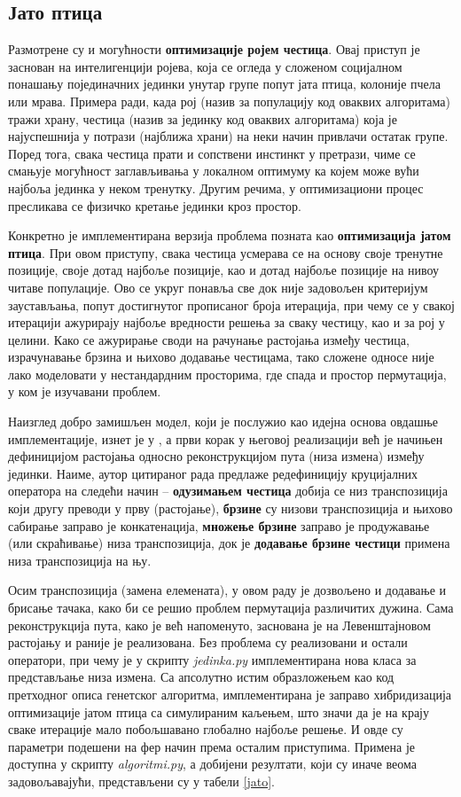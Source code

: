 \documentclass[a4paper]{article}
\begin{document}
\subsection{Јато птица}

Размотрене су и могућности \textbf{оптимизације ројем честица}. Овај приступ је заснован на интелигенцији ројева, која се огледа у сложеном социјалном понашању појединачних јединки унутар групе попут јата птица, колоније пчела или мрава. Примера ради, када рој (назив за популацију код оваквих алгоритама) тражи храну, честица (назив за јединку код оваквих алгоритама) која је најуспешнија у потрази (најближа храни) на неки начин привлачи остатак групе. Поред тога, свака честица прати и сопствени инстинкт у претрази, чиме се смањује могућност заглављивања у локалном оптимуму ка којем може вући најбоља јединка у неком тренутку. Другим речима, у оптимизациони процес пресликава се физичко кретање јединки кроз простор.

Конкретно је имплементирана верзија проблема позната као \textbf{оптимизација јатом птица}. При овом приступу, свака честица усмерава се на основу своје тренутне позиције, своје дотад најбоље позиције, као и дотад најбоље позиције на нивоу читаве популације. Ово се укруг понавља све док није задовољен критеријум заустављања, попут достигнутог прописаног броја итерација, при чему се у свакој итерацији ажурирају најбоље вредности решења за сваку честицу, као и за рој у целини. Како се ажурирање своди на рачунање растојања између честица, израчунавање брзина и њихово додавање честицама, тако сложене односе није лако моделовати у нестандардним просторима, где спада и простор пермутација, у ком је изучавани проблем.

Наизглед добро замишљен модел, који је послужио као идејна основа овдашње имплементације, изнет је у \cite{clerc}, а први корак у његовој реализацији већ је начињен дефиницијом растојања односно реконструкцијом пута (низа измена) између јединки. Наиме, аутор цитираног рада предлаже редефиницију круцијалних оператора на следећи начин -- \textbf{одузимањем честица} добија се низ транспозиција који другу преводи у прву (растојање), \textbf{брзине} су низови транспозиција и њихово сабирање заправо је конкатенација, \textbf{множење брзине} заправо је продужавање (или скраћивање) низа транспозиција, док је \textbf{додавање брзине честици} примена низа транспозиција на њу.

Осим транспозиција (замена елемената), у овом раду је дозвољено и додавање и брисање тачака, како би се решио проблем пермутација различитих дужина. Сама реконструкција пута, како је већ напоменуто, заснована је на Левенштајновом растојању и раније је реализована. Без проблема су реализовани и остали оператори, при чему је у скрипту \textit{jedinka.py} имплементирана нова класа за представљање низа измена. Са апсолутно истим образложењем као код претходног описа генетског алгоритма, имплементирана је заправо хибридизација оптимизације јатом птица са симулираним каљењем, што значи да је на крају сваке итерације мало побољшавано глобално најбоље решење. И овде су параметри подешени на фер начин према осталим приступима. Примена је доступна у скрипту \textit{algoritmi.py}, а добијени резултати, који су иначе веома задовољавајући, представљени су у табели \ref{jato}.
\end{document}
